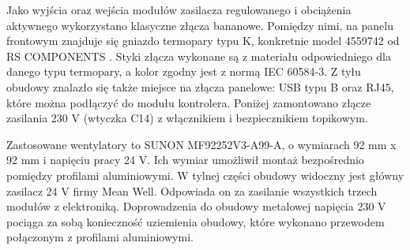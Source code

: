 Jako wyjścia oraz wejścia modułów zasilacza regulowanego i obciążenia aktywnego wykorzystano klasyczne złącza bananowe.
Pomiędzy nimi, na panelu frontowym znajduje się gniazdo termopary typu K, konkretnie model 4559742 od RS COMPONENTS \cite{ktypeconn}.
Styki złącza wykonane są z materiału odpowiedniego dla danego typu termopary, a kolor zgodny jest z normą IEC 60584-3.
Z tyłu obudowy znalazło się także miejsce na złącza panelowe: USB typu B oraz RJ45, które można podłączyć do modułu kontrolera.
Poniżej zamontowano złącze zasilania 230 V (wtyczka C14) z włącznikiem i bezpiecznikiem topikowym.

Zastosowane wentylatory to SUNON MF92252V3-A99-A, o wymiarach 92 mm x 92 mm i napięciu pracy 24 V. Ich wymiar umożliwił 
montaż bezpośrednio pomiędzy profilami aluminiowymi. W tylnej części obudowy widoczny jest główny zasilacz 24 V firmy Mean Well.
Odpowiada on za zasilanie wszystkich trzech modułów z elektroniką. Doprowadzenia do obudowy metalowej napięcia 230 V 
pociąga za sobą konieczność uziemienia obudowy, które wykonano przewodem połączonym z profilami aluminiowymi.